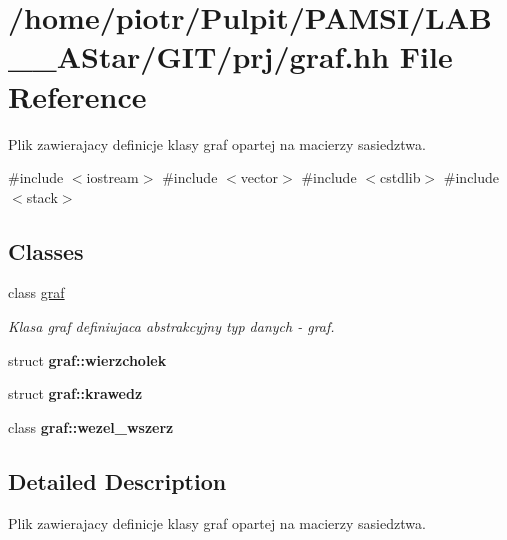\hypertarget{graf_8hh}{\section{/home/piotr/\-Pulpit/\-P\-A\-M\-S\-I/\-L\-A\-B\-\_\-\_\-\-A\-Star/\-G\-I\-T/prj/graf.hh \-File \-Reference}
\label{graf_8hh}
}


\-Plik zawierajacy definicje klasy graf opartej na macierzy sasiedztwa.  


{\ttfamily \#include $<$iostream$>$}\*
{\ttfamily \#include $<$vector$>$}\*
{\ttfamily \#include $<$cstdlib$>$}\*
{\ttfamily \#include $<$stack$>$}\*
\subsection*{\-Classes}
\begin{DoxyCompactItemize}
\item 
class \hyperlink{classgraf}{graf}
\begin{DoxyCompactList}\small\item\em \-Klasa graf definiujaca abstrakcyjny typ danych -\/ graf. \end{DoxyCompactList}\item 
struct {\bfseries graf\-::wierzcholek}
\item 
struct {\bfseries graf\-::krawedz}
\item 
class {\bfseries graf\-::wezel\-\_\-wszerz}
\end{DoxyCompactItemize}


\subsection{\-Detailed \-Description}
\-Plik zawierajacy definicje klasy graf opartej na macierzy sasiedztwa. 